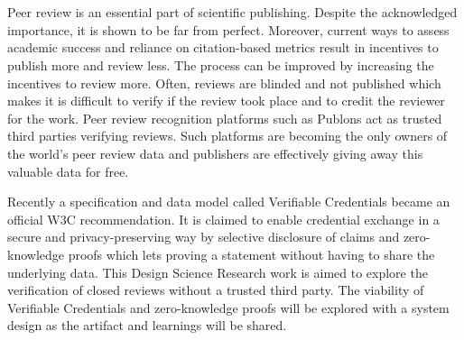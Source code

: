 \chapter{\abstractname}

Peer review is an essential part of scientific publishing. Despite the acknowledged importance, it is shown to be far from perfect. Moreover, current ways to assess academic success and reliance on citation-based metrics result in incentives to publish more and review less. The process can be improved by increasing the incentives to review more. Often, reviews are blinded and not published which makes it is difficult to verify if the review took place and to credit the reviewer for the work. Peer review recognition platforms such as Publons act as trusted third parties verifying reviews. Such platforms are becoming the only owners of the world’s peer review data and publishers are effectively giving away this valuable data for free. 

Recently a specification and data model called Verifiable Credentials became an official W3C recommendation. It is claimed to enable credential exchange in a secure and privacy-preserving way by selective disclosure of claims and zero-knowledge proofs which lets proving a statement without having to share the underlying data. This Design Science Research work is aimed to explore the verification of closed reviews without a trusted third party. The viability of Verifiable Credentials and zero-knowledge proofs will be explored with a system design as the artifact and learnings will be shared.

\makeatletter
{}
{\renewcommand{\abstractname}{Kurzfassung}}
{\renewcommand{\abstractname}{Abstract}}
\makeatother

\chapter{\abstractname}

\begin{otherlanguage}{ngerman} %

\end{otherlanguage}


\makeatletter
{}
{\renewcommand{\abstractname}{Abstract}}
{\renewcommand{\abstractname}{Kurzfassung}}
\makeatother